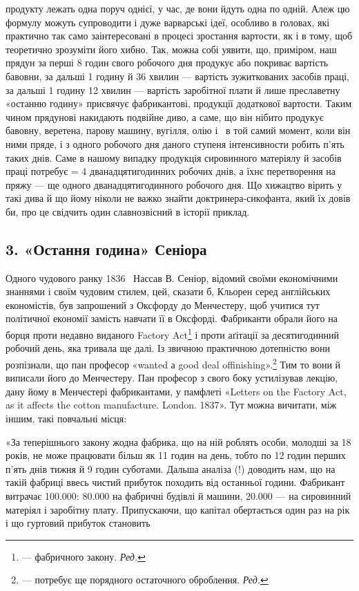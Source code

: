 \parcont{}  %
продукту лежать одна поруч однієї, у час, де вони йдуть одна по одній. Алеж цю формулу можуть
супроводити і дуже варварські ідеї, особливо в головах, які практично так само заінтересовані
в процесі зростання вартости, як і в тому, щоб теоретично зрозуміти його хибно. Так, можна собі
уявити, що, приміром, наш прядун за перші 8 годин свого робочого дня продукує або покриває вартість
бавовни, за дальші 1 годину й 36 хвилин — вартість зужиткованих засобів праці, за дальші 1 годину 12
хвилин — вартість заробітної плати й лише преславетну «останню
годину» присвячує фабрикантові, продукції додаткової вартости. Таким чином прядунові накидають
подвійне диво, а саме, що він нібито продукує бавовну, веретена, парову машину, вугілля,
олію і~ в той самий момент, коли він ними пряде, і з одного робочого дня даного ступеня
інтенсивности робить п’ять
таких днів. Саме в нашому випадку продукція сировинного матеріялу й засобів праці потребує  = 4
дванадцятигодинних робочих днів, а їхнє перетворення на пряжу — ще одного дванадцятигодинного
робочого дня. Що хижацтво вірить у такі дива й що йому ніколи не важко знайти доктринера-сикофанта,
який їх довів би, про це свідчить один славнозвісний в історії приклад.

\subsection*{3. «Остання година» Сеніора}
Одного чудового ранку 1836~ Нассав В. Сеніор, відомий своїми економічними знаннями і своїм чудовим
стилем, цей, сказати б, Кльорен серед англійських економістів, був запрошений
з Оксфорду до Менчестеру, щоб учитися тут політичної економії замість навчати її в Оксфорді.
Фабриканти обрали його на борця проти недавно виданого Factory Act\footnote*{
— фабричного закону. \emph{Ред.}
} і проти аґітації за
десятигодинний
робочий день, яка тривала ще далі. Із звичною практичною дотепністю вони розпізнали, що пан професор
«wanted а
good deal offinishing».\footnote*{
— потребує ще порядного остаточного оброблення. \emph{Ред.}
} Тим то вони й виписали його до Менчестеру. Пан професор з свого боку
устилізував лекцію, дану йому в Менчестері фабрикантами, у памфлеті «Letters on the Factory Act, as
it affects the cotton manufacture. London. 1837». Тут можна вичитати, між іншим, такі повчальні
місця:

«За теперішнього закону жодна фабрика, що на ній роблять особи, молодші за 18 років, не може
працювати більш як 11 годин на день, тобто по 12 годин перших п’ять днів тижня й 9 годин
суботами. Дальша аналіза (!) доводить нам, що на такій фабриці ввесь чистий прибуток походить від
останньої години. Фабрикант
витрачає \num{100.000}: \num{80.000} на фабричні будівлі й машини, \num{20.000} — на сировинний матеріял і заробітну плату. Припускаючи, що капітал обертається
один раз на рік і що гуртовий прибуток становить
\parbreak{}  %
